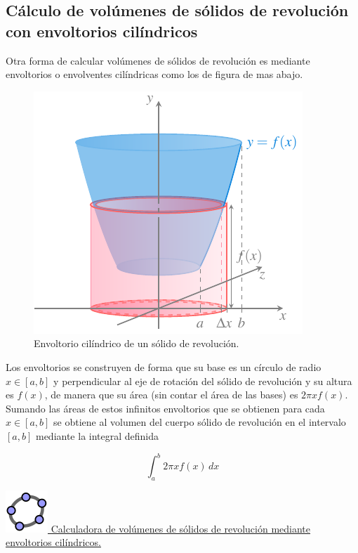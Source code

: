 \documentclass[
  a4paper,
]{scrreport}
\theoremstyle{definition}
\theoremstyle{plain}
\theoremstyle{definition}
\theoremstyle{definition}
\theoremstyle{plain}
\theoremstyle{plain}
\theoremstyle{remark}
\begin{document}
\subsection{Cálculo de volúmenes de sólidos de revolución con
envoltorios
cilíndricos}\label{cuxe1lculo-de-voluxfamenes-de-suxf3lidos-de-revoluciuxf3n-con-envoltorios-ciluxedndricos}

Otra forma de calcular volúmenes de sólidos de revolución es mediante
envoltorios o envolventes cilíndricas como los de figura de mas abajo.

\begin{figure}[H]

{\centering \includegraphics{img/integrales/envoltorio-cilindrico-solido-revolucion.pdf}

}

\caption{Envoltorio cilíndrico de un sólido de revolución.}

\end{figure}%

Los envoltorios se construyen de forma que su base es un círculo de
radio \(x\in [a,b]\) y perpendicular al eje de rotación del sólido de
revolución y su altura es \(f(x)\), de manera que su área (sin contar el
área de las bases) es \(2\pi x f(x)\). Sumando las áreas de estos
infinitos envoltorios que se obtienen para cada \(x\in[a,b]\) se obtiene
al volumen del cuerpo sólido de revolución en el intervalo \([a,b]\)
mediante la integral definida

\[
\int_a^b 2\pi x f(x)\,dx
\]

\href{https://www.geogebra.org/classic/bcpdxmpf}{\includegraphics{img/logos/logo-geogebra.png}
Calculadora de volúmenes de sólidos de revolución mediante envoltorios
cilíndricos.}
\end{document}
